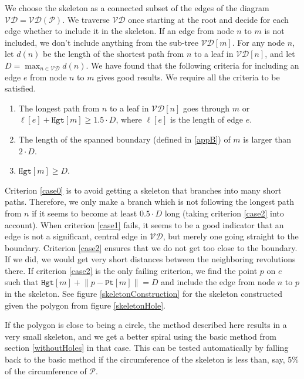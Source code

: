 \documentclass[3p]{elsarticle}
\newcommand{\VD}{\mathcal{VD}}
\newcommand{\PP}{\mathcal{P}}
\newcommand{\height}{\texttt{Hgt}}
\newcommand{\point}{\texttt{Pt}}
\begin{document}
We choose the skeleton as a connected subset of the edges of the diagram $\VD=\VD(\PP)$.
We traverse $\VD$ once starting at the root and decide for each edge whether to include it in the
skeleton. If an edge from node $n$ to $m$ is not included, we don't include anything from the sub-tree
$\VD[m]$.
For any node $n$, let $d(n)$ be the length of the shortest path from $n$ to a leaf in $\VD[n]$, and
let $D=\max_{n\in\VD} d(n)$. We have found that the following criteria for including
an edge $e$ from node $n$ to $m$ gives good results. We require all the criteria to be satisfied.
\begin{enumerate}
\setlength\itemsep{0em}
\item \label{case0} The longest path from $n$ to a leaf in $\VD[n]$ goes
through $m$ or $\ell[e]+\height[m]\geq 1.5\cdot D$, where $\ell[e]$ is the length of edge $e$.

\item \label{case1} The length of the spanned boundary (defined in \ref{appB})
of $m$ is larger than $2\cdot D$.

\item \label{case2} $\height[m]\geq D$.
\end{enumerate}

Criterion \ref{case0} is to avoid getting a skeleton that branches into many short paths. Therefore,
we only make a branch which is not following the longest path from $n$ if it seems to
become at least $0.5\cdot D$ long
(taking criterion \ref{case2} into account).
When criterion \ref{case1} fails,
it seems to be a good indicator that an edge is not a significant, central edge
in $\VD$, but merely one going straight to the boundary.
Criterion \ref{case2} ensures that we do not get too close to the boundary. If we did, we would get
very short distances between the neighboring revolutions there. If
criterion \ref{case2} is the only failing criterion, we find the point $p$ on $e$ such that
$\height[m]+\lVert p-\point[m]\rVert = D$ and include the edge from node $n$ to $p$
in the skeleton. See figure \ref{skeletonConstruction} for the skeleton constructed
given the polygon from figure \ref{skeletonHole}.

If the polygon is close to being a circle, the method described here
results in a very small skeleton, and we get a better spiral using the
basic method from section \ref{withoutHoles} in that case.
This can be tested automatically by falling back to the basic method if
the circumference of the skeleton is less than, say, 5\% of the circumference of $\PP$.
\end{document}
